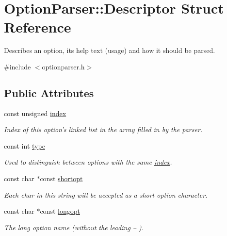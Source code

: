 \hypertarget{struct_option_parser_1_1_descriptor}{\section{Option\-Parser\-:\-:Descriptor Struct Reference}
\label{struct_option_parser_1_1_descriptor}
}


Describes an option, its help text (usage) and how it should be parsed.  




{\ttfamily \#include $<$optionparser.\-h$>$}

\subsection*{Public Attributes}
\begin{DoxyCompactItemize}
\item 
const unsigned \hyperlink{struct_option_parser_1_1_descriptor_ae62860781844b44c0bd4f730c96701d7}{index}
\begin{DoxyCompactList}\small\item\em Index of this option's linked list in the array filled in by the parser. \end{DoxyCompactList}\item 
const int \hyperlink{struct_option_parser_1_1_descriptor_a070d24a33fc9f30cf3deafa428ff7fa7}{type}
\begin{DoxyCompactList}\small\item\em Used to distinguish between options with the same \hyperlink{struct_option_parser_1_1_descriptor_ae62860781844b44c0bd4f730c96701d7}{index}. \end{DoxyCompactList}\item 
const char $\ast$const \hyperlink{struct_option_parser_1_1_descriptor_a21415d74531b006e9a7a06ccadbd2721}{shortopt}
\begin{DoxyCompactList}\small\item\em Each char in this string will be accepted as a short option character. \end{DoxyCompactList}\item 
const char $\ast$const \hyperlink{struct_option_parser_1_1_descriptor_ab9db8207bae68dd5c4ee83e05189a9d0}{longopt}
\begin{DoxyCompactList}\small\item\em The long option name (without the leading {\ttfamily --} ). \end{DoxyCompactList}\item 

\end{DoxyCompactItemize}
